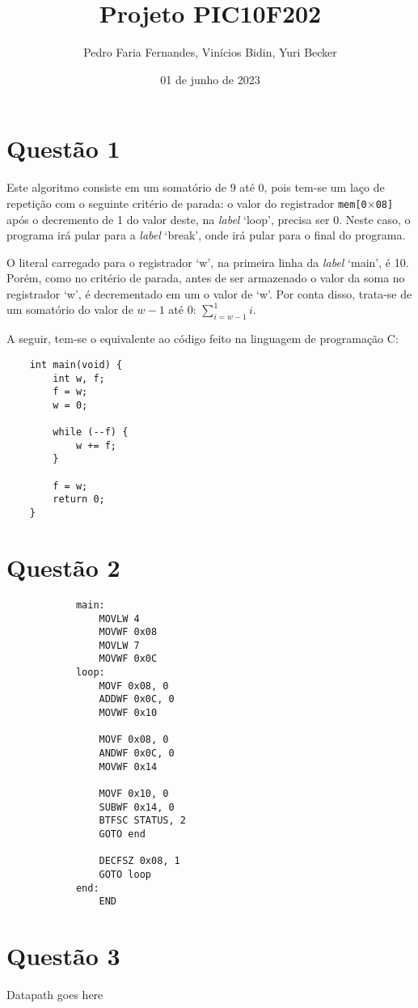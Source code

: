 \documentclass[12pt]{report}
\title{Projeto PIC10F202}
\author{Pedro Faria Fernandes, Vinícios Bidin, Yuri Becker}
\date{01 de junho de 2023}
\begin{document}
	\maketitle
	\section*{Questão 1}
		Este algoritmo consiste em um somatório de 9 até 0, pois tem-se um laço de repetição com o seguinte critério de parada: o valor do registrador \texttt{mem[0$\times$08]}
		após o decremento de 1 do valor deste, na \textit{label} `loop', precisa ser 0. Neste caso, o programa irá pular para a \textit{label} `break', onde irá pular para o final do programa.

		O literal carregado para o registrador `w', na primeira linha da \textit{label} `main', é 10. Porém, como no critério de parada, antes de ser armazenado o valor da soma no registrador `w', é decrementado em um o valor de `w'. Por conta disso, trata-se de um somatório do valor de $w - 1$ até 0: $\sum\limits_{i=w-1}^{1}i$.

		A seguir, tem-se o equivalente ao código feito na linguagem de programação C:\@
	\begin{verbatim}
	int main(void) {
		int w, f;
		f = w;
		w = 0;

		while (--f) {
			w += f;
		}

		f = w;
		return 0;
	}
	\end{verbatim}
	\clearpage
	\section*{Questão 2}
		\begin{verbatim}
			main:
			    MOVLW 4
			    MOVWF 0x08
			    MOVLW 7
			    MOVWF 0x0C
			loop:
			    MOVF 0x08, 0
			    ADDWF 0x0C, 0
			    MOVWF 0x10

			    MOVF 0x08, 0
			    ANDWF 0x0C, 0
			    MOVWF 0x14

			    MOVF 0x10, 0
			    SUBWF 0x14, 0
			    BTFSC STATUS, 2
			    GOTO end

			    DECFSZ 0x08, 1
			    GOTO loop
			end:
			    END
		\end{verbatim}
	\clearpage
	\section*{Questão 3}
		Datapath goes here
	\clearpage
\end{document}
